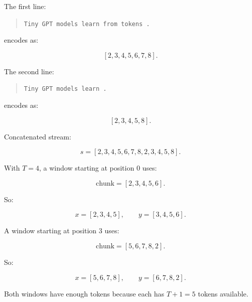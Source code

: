 The first line:

\begin{quote}
\texttt{Tiny GPT models learn from tokens .}
\end{quote}

encodes as:

\[
[2,3,4,5,6,7,8].
\]

The second line:

\begin{quote}
\texttt{Tiny GPT models learn .}
\end{quote}

encodes as:

\[
[2,3,4,5,8].
\]

Concatenated stream:

\[
s=[2,3,4,5,6,7,8,2,3,4,5,8].
\]

With \(T=4\), a window starting at position 0 uses:

\[
\text{chunk}=[2,3,4,5,6].
\]

So:

\[
x=[2,3,4,5],
\qquad
y=[3,4,5,6].
\]

A window starting at position 3 uses:

\[
\text{chunk}=[5,6,7,8,2].
\]

So:

\[
x=[5,6,7,8],
\qquad
y=[6,7,8,2].
\]

Both windows have enough tokens because each has \(T+1=5\) tokens available.
